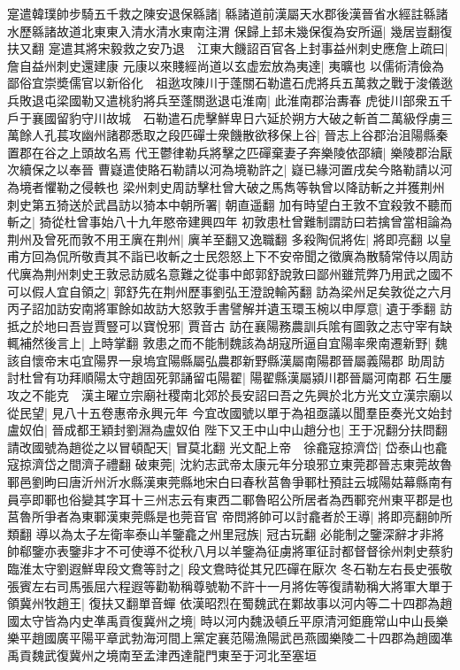 寔遣韓璞帥步騎五千救之陳安退保緜諸|{
	緜諸道前漢屬天水郡後漢晉省水經註緜諸水歷緜諸故道北東東入清水清水東南注渭}
保歸上邽未幾保復為安所逼|{
	幾居豈翻復扶又翻}
寔遣其將宋毅救之安乃退　江東大饑詔百官各上封事益州刺史應詹上疏曰|{
	詹自益州刺史還建康}
元康以來賤經尚道以玄虚宏放為夷達|{
	夷曠也}
以儒術清儉為鄙俗宜崇奬儒官以新俗化　祖逖攻陳川于蓬關石勒遣石虎將兵五萬救之戰于浚儀逖兵敗退屯梁國勒又遣桃豹將兵至蓬關逖退屯淮南|{
	此淮南郡治夀春}
虎徙川部衆五千戶于襄國留豹守川故城　石勒遣石虎擊鮮卑日六延於朔方大破之斬首二萬級俘虜三萬餘人孔萇攻幽州諸郡悉取之段匹磾士衆饑散欲移保上谷|{
	晉志上谷郡治沮陽縣秦置郡在谷之上頭故名焉}
代王鬱律勒兵將擊之匹磾棄妻子奔樂陵依邵續|{
	樂陵郡治厭次續保之以奉晉}
曹嶷遣使賂石勒請以河為境勒許之|{
	嶷已緣河置戌矣今賂勒請以河為境者懼勒之侵軼也}
梁州刺史周訪擊杜曾大破之馬雋等執曾以降訪斬之并獲荆州刺史第五猗送於武昌訪以猗本中朝所署|{
	朝直遥翻}
加有時望白王敦不宜殺敦不聽而斬之|{
	猗從杜曾事始八十九年愍帝建興四年}
初敦患杜曾難制謂訪曰若擒曾當相論為荆州及曾死而敦不用王廙在荆州|{
	廙羊至翻又逸職翻}
多殺陶侃將佐|{
	將即亮翻}
以皇甫方回為侃所敬責其不詣已收斬之士民怨怒上下不安帝聞之徵廙為散騎常侍以周訪代廙為荆州刺史王敦忌訪威名意難之從事中郎郭舒說敦曰鄙州雖荒弊乃用武之國不可以假人宜自領之|{
	郭舒先在荆州歷事劉弘王澄說輸芮翻}
訪為梁州足矣敦從之六月丙子詔加訪安南將軍餘如故訪大怒敦手書譬解并遺玉環玉椀以申厚意|{
	遺于季翻}
訪抵之於地曰吾豈賈豎可以寶悅邪|{
	賈音古}
訪在襄陽務農訓兵隂有圖敦之志守宰有缺輒補然後言上|{
	上時掌翻}
敦患之而不能制魏該為胡寇所逼自宜陽率衆南遷新野|{
	魏該自懷帝末屯宜陽界一泉塢宜陽縣屬弘農郡新野縣漢屬南陽郡晉屬義陽郡}
助周訪討杜曾有功拜順陽太守趙固死郭誦留屯陽翟|{
	陽翟縣漢屬潁川郡晉屬河南郡}
石生屢攻之不能克　漢主曜立宗廟社稷南北郊於長安詔曰吾之先興於北方光文立漢宗廟以從民望|{
	見八十五卷惠帝永興元年}
今宜改國號以單于為祖亟議以聞羣臣奏光文始封盧奴伯|{
	晉成都王穎封劉淵為盧奴伯}
陛下又王中山中山趙分也|{
	王于况翻分扶問翻}
請改國號為趙從之以冒頓配天|{
	冒莫北翻}
光文配上帝　徐龕寇掠濟岱|{
	岱泰山也龕寇掠濟岱之間濟子禮翻}
破東莞|{
	沈約志武帝太康元年分琅邪立東莞郡晉志東莞故魯鄆邑劉昫曰唐沂州沂水縣漢東莞縣地宋白曰春秋莒魯爭鄆杜預註云城陽姑幕縣南有員亭即鄆也俗變其字耳十三州志云有東西二鄆魯昭公所居者為西鄆兖州東平郡是也莒魯所爭者為東鄆漢東莞縣是也莞音官}
帝問將帥可以討龕者於王導|{
	將即亮翻帥所類翻}
導以為太子左衛率泰山羊鑒龕之州里冠族|{
	冠古玩翻}
必能制之鑒深辭才非將帥郗鑒亦表鑒非才不可使導不從秋八月以羊鑒為征虜將軍征討都督督徐州刺史蔡豹臨淮太守劉遐鮮卑段文鴦等討之|{
	段文鴦時從其兄匹磾在厭次}
冬石勒左右長史張敬張賓左右司馬張屈六程遐等勸勒稱尊號勒不許十一月將佐等復請勒稱大將軍大單于領冀州牧趙王|{
	復扶又翻單音蟬}
依漢昭烈在蜀魏武在鄴故事以河内等二十四郡為趙國太守皆為内史凖禹貢復冀州之境|{
	時以河内魏汲頓丘平原清河鉅鹿常山中山長樂樂平趙國廣平陽平章武勃海河間上黨定襄范陽漁陽武邑燕國樂陵二十四郡為趙國凖禹貢魏武復冀州之境南至孟津西達龍門東至于河北至塞垣}
